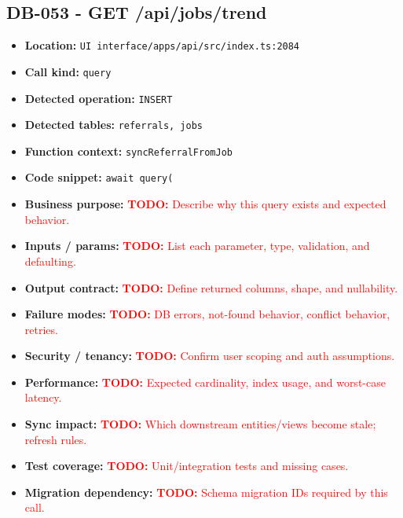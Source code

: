 \documentclass[11pt]{article}
\newcommand{\todoitem}[1]{\textcolor{red}{\textbf{TODO:} #1}}
\begin{document}
\subsection{DB-053 - GET /api/jobs/trend}
\begin{itemize}[leftmargin=1.5em]
\item \textbf{Location:} \texttt{UI interface/apps/api/src/index.ts:2084}
\item \textbf{Call kind:} \texttt{query}
\item \textbf{Detected operation:} \texttt{INSERT}
\item \textbf{Detected tables:} \texttt{referrals, jobs}
\item \textbf{Function context:} \texttt{syncReferralFromJob}
\item \textbf{Code snippet:} \texttt{await query(}
\item \textbf{Business purpose:} \todoitem{Describe why this query exists and expected behavior.}
\item \textbf{Inputs / params:} \todoitem{List each parameter, type, validation, and defaulting.}
\item \textbf{Output contract:} \todoitem{Define returned columns, shape, and nullability.}
\item \textbf{Failure modes:} \todoitem{DB errors, not-found behavior, conflict behavior, retries.}
\item \textbf{Security / tenancy:} \todoitem{Confirm user scoping and auth assumptions.}
\item \textbf{Performance:} \todoitem{Expected cardinality, index usage, and worst-case latency.}
\item \textbf{Sync impact:} \todoitem{Which downstream entities/views become stale; refresh rules.}
\item \textbf{Test coverage:} \todoitem{Unit/integration tests and missing cases.}
\item \textbf{Migration dependency:} \todoitem{Schema migration IDs required by this call.}
\end{itemize}
\end{document}

